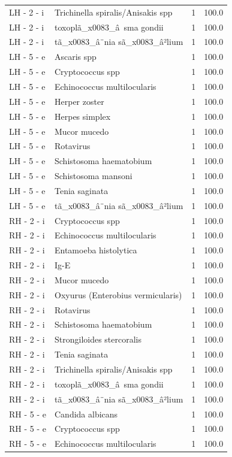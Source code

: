 \documentclass[a4paper,11pt]{article}
\begin{document}
\begin{footnotesize}
\begin{longtable}{p{3.5cm}p{7.5cm}rr}
LH - 2 - i & Trichinella spiralis/Anisakis spp & 1 & 100.0 \\
LH - 2 - i & toxoplã\_x0083\_â sma gondii & 1 & 100.0 \\
LH - 2 - i & tã\_x0083\_â¨nia sã\_x0083\_â²lium & 1 & 100.0 \\
LH - 5 - e & Ascaris spp & 1 & 100.0 \\
LH - 5 - e & Cryptococcus spp & 1 & 100.0 \\
LH - 5 - e & Echinococcus multilocularis & 1 & 100.0 \\
LH - 5 - e & Herper zoster & 1 & 100.0 \\
LH - 5 - e & Herpes simplex & 1 & 100.0 \\
LH - 5 - e & Mucor mucedo & 1 & 100.0 \\
LH - 5 - e & Rotavirus & 1 & 100.0 \\
LH - 5 - e & Schistosoma haematobium & 1 & 100.0 \\
LH - 5 - e & Schistosoma mansoni & 1 & 100.0 \\
LH - 5 - e & Tenia saginata & 1 & 100.0 \\
LH - 5 - e & tã\_x0083\_â¨nia sã\_x0083\_â²lium & 1 & 100.0 \\
RH - 2 - i & Cryptococcus spp & 1 & 100.0 \\
RH - 2 - i & Echinococcus multilocularis & 1 & 100.0 \\
RH - 2 - i & Entamoeba histolytica & 1 & 100.0 \\
RH - 2 - i & Ig-E & 1 & 100.0 \\
RH - 2 - i & Mucor mucedo & 1 & 100.0 \\
RH - 2 - i & Oxyurus (Enterobius vermicularis) & 1 & 100.0 \\
RH - 2 - i & Rotavirus & 1 & 100.0 \\
RH - 2 - i & Schistosoma haematobium & 1 & 100.0 \\
RH - 2 - i & Strongiloides stercoralis & 1 & 100.0 \\
RH - 2 - i & Tenia saginata & 1 & 100.0 \\
RH - 2 - i & Trichinella spiralis/Anisakis spp & 1 & 100.0 \\
RH - 2 - i & toxoplã\_x0083\_â sma gondii & 1 & 100.0 \\
RH - 2 - i & tã\_x0083\_â¨nia sã\_x0083\_â²lium & 1 & 100.0 \\
RH - 5 - e & Candida albicans & 1 & 100.0 \\
RH - 5 - e & Cryptococcus spp & 1 & 100.0 \\
RH - 5 - e & Echinococcus multilocularis & 1 & 100.0 \\

\end{longtable}
\end{footnotesize}
\end{document}
